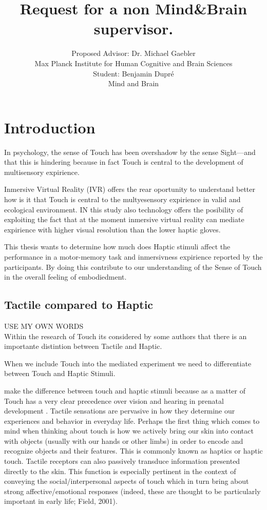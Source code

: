\documentclass{article}
\title{Request for a non Mind\&Brain supervisor.}
\author{
    {Proposed Advisor: Dr. Michael Gaebler}\\[0cm]
    {Max Planck Institute for Human Cognitive and Brain Sciences}\\[0,4cm]
    {\small Student: Benjamin Dupré}\\[0cm]
    {\small Mind and Brain}} %
\begin{document}
\maketitle
\pagebreak

 
\section{Introduction}

In psychology, the sense of Touch has been overshadow by the sense Sight---and that this is hindering because in fact Touch is central to the development of multisensory expirience\cite{BREMNER2017227}.

Inmersive Virtual Reality (IVR) offers the rear oportunity to understand better how is it that Touch is central to the multyesensory expirience in valid and ecological environment. IN this study also  technology offers the posibility of exploiting the fact that at the moment inmersive virtual reality can mediate expirience with higher visual resolution than the lower haptic gloves. 

This thesis wants to determine how much does Haptic stimuli affect the performance in a motor-memory task and inmersivness expirience reported by the participants. By doing this contribute to our understanding of the Sense of Touch in the overall feeling of embodiedment. 
 
 \subsection{ Tactile compared to Haptic}
 USE MY OWN WORDS \newline \\

Within the research of Touch its considered by some authors that there is an importante distintion between Tactile and Haptic.

When we include Touch into the mediated experiment we need to differentiate between Touch and Haptic Stimuli. 



make the difference between touch and haptic stimuli because as a matter of   
Touch has a very clear precedence over vision and hearing in prenatal
development \citep{bremner2012multisensory}. Tactile sensations are pervasive in how they determine our experiences and behavior in everyday life. Perhaps the first thing which comes to mind when thinking about touch is how we actively bring our skin into contact with objects (usually with our hands or other limbs) in order to encode and recognize objects and their features. This is commonly known as haptics or haptic touch. Tactile receptors can also passively transduce information presented directly to the skin. This function is especially pertinent in the context of conveying the social/interpersonal aspects of touch which in turn bring about strong affective/emotional responses (indeed, these are thought to be particularly important in early life; Field, 2001).
\end{document}
